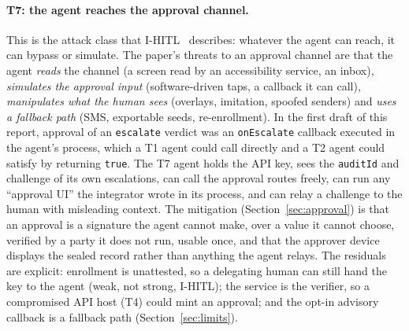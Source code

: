 \documentclass[10pt]{article}
\newcommand{\code}[1]{{\def\_{\char`\_\allowbreak}\texttt{#1}}}
\begin{document}
\paragraph{T7: the agent reaches the approval channel.} This is the attack class that I-HITL~\cite{ihitl} describes: whatever the agent can reach, it can bypass or simulate. The paper's threats to an approval channel are that the agent \emph{reads} the channel (a screen read by an accessibility service, an inbox), \emph{simulates the approval input} (software-driven taps, a callback it can call), \emph{manipulates what the human sees} (overlays, imitation, spoofed senders) and \emph{uses a fallback path} (SMS, exportable seeds, re-enrollment). In the first draft of this report, approval of an \code{escalate} verdict was an \code{onEscalate} callback executed in the agent's process, which a T1 agent could call directly and a T2 agent could satisfy by returning \code{true}. The T7 agent holds the API key, sees the \code{auditId} and challenge of its own escalations, can call the approval routes freely, can run any ``approval UI'' the integrator wrote in its process, and can relay a challenge to the human with misleading context. The mitigation (Section~\ref{sec:approval}) is that an approval is a signature the agent cannot make, over a value it cannot choose, verified by a party it does not run, usable once, and that the approver device displays the sealed record rather than anything the agent relays. The residuals are explicit: enrollment is unattested, so a delegating human can still hand the key to the agent (weak, not strong, I-HITL); the service is the verifier, so a compromised API host (T4) could mint an approval; and the opt-in advisory callback is a fallback path (Section~\ref{sec:limits}).
\end{document}
